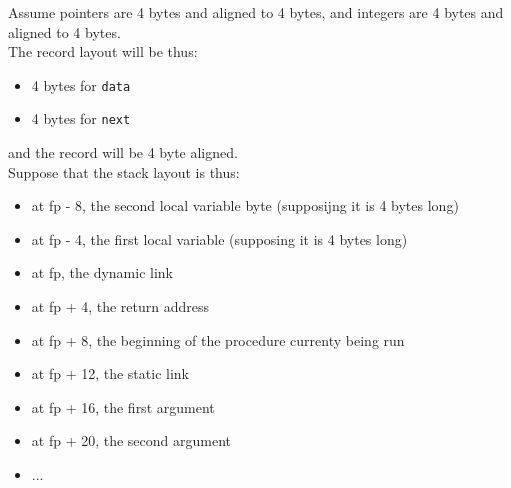 Assume pointers are 4 bytes and aligned to 4 bytes, and integers are 4 bytes and aligned to 4 bytes. \\
The record layout will be thus:
\begin{itemize}
\item 4 bytes for \texttt{data}
\item 4 bytes for \texttt{next}
\end{itemize}
and the record will be 4 byte aligned. \\

Suppose that the stack layout is thus:

\begin{itemize}
\item at fp - 8, the second local variable byte (supposijng it is 4 bytes long)
\item at fp - 4, the first local variable (supposing it is 4 bytes long)
\item at fp, the dynamic link
\item at fp + 4, the return address
\item at fp + 8, the beginning of the procedure currenty being run
\item at fp + 12, the static link
\item at fp + 16, the first argument
\item at fp + 20, the second argument
\item ...
\end{itemize}
